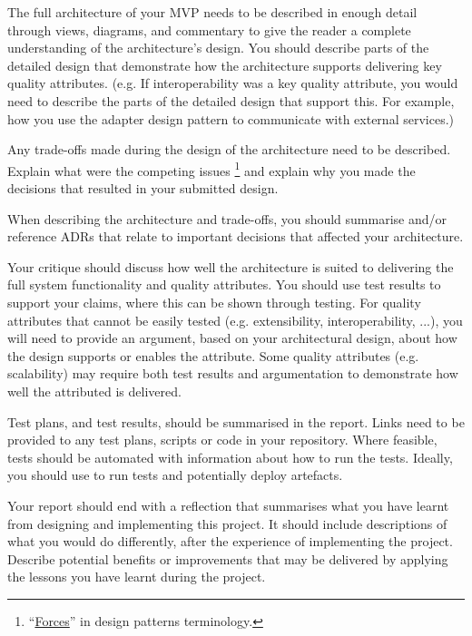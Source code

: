 \documentclass{csse4400}
\begin{document}
The full architecture of your MVP needs to be described in enough detail through views, diagrams, and commentary
to give the reader a complete understanding of the architecture's design.
You should describe parts of the detailed design that demonstrate how the architecture supports delivering key quality attributes.
(e.g. If interoperability was a key quality attribute, you would need to describe the parts of the detailed design that support this.
For example, how you use the adapter design pattern to communicate with external services.)

Any trade-offs made during the design of the architecture need to be described.
Explain what were the competing issues%
\footnote{``\href{http://www.cs.unc.edu/~stotts/COMP723-s15/patterns/forces.html}{Forces}'' in design patterns terminology.}
and explain why you made the decisions that resulted in your submitted design.

When describing the architecture and trade-offs,
you should summarise and/or reference ADRs that relate to important decisions that affected your architecture.

Your critique should discuss how well the architecture is suited to delivering the full system functionality and quality attributes.
You should use test results to support your claims, where this can be shown through testing.
For quality attributes that cannot be easily tested (e.g. extensibility, interoperability, ...),
you will need to provide an argument, based on your architectural design, about how the design supports or enables the attribute.
Some quality attributes (e.g. scalability) may require both test results
and argumentation to demonstrate how well the attributed is delivered.

Test plans, and test results, should be summarised in the report.
Links need to be provided to any test plans, scripts or code in your repository.
Where feasible, tests should be automated with information about how to run the tests.
Ideally, you should use  to run tests and potentially deploy artefacts.

Your report should end with a reflection that summarises what you have learnt from designing and implementing this project.
It should include descriptions of what you would do differently, after the experience of implementing the project.
Describe potential benefits or improvements that may be delivered by applying the lessons you have learnt during the project.
\end{document}
